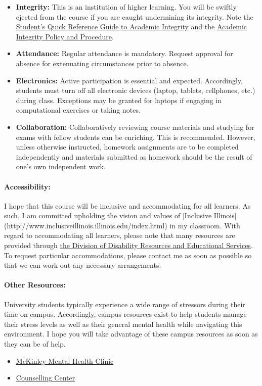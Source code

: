 \documentclass[11pt, a4paper]{article}
\begin{document}
\begin{itemize}
\item[] \textbf{Integrity:} This is an institution of higher
learning. You will be swiftly ejected from the course if you are caught
undermining its integrity. Note the
\href{http://www.provost.illinois.edu/academicintegrity/students.html}{Student's
Quick Reference Guide to Academic Integrity} and the
\href{http://studentcode.illinois.edu/article1_part4_1-401.html}{Academic
Integrity Policy and Procedure}.  
\item[] \textbf{Attendance:} Regular attendance is mandatory. Request approval for absence for extenuating circumstances prior to absence.
\item[] \textbf{Electronics:} Active participation is essential and expected. 
        Accordingly, students must turn off all electronic devices (laptop, 
        tablets, cellphones, etc.) during class. Exceptions may be granted for 
        laptops if engaging in computational exercises or taking notes. 
\item[] \textbf{Collaboration:} Collaboratively reviewing course materials and studying for exams with fellow students can be enriching.  This is recommended.  However, unless otherwise instructed, homework assignments are to be completed independently and materials submitted as homework should be the result of one's own independent work.
\end{itemize}

\paragraph{Accessibility:} I hope that this course will be inclusive and 
accommodating for all learners. As such, I am committed upholding the vision 
and values of [Inclusive 
Illinois](http://www.inclusiveillinois.illinois.edu/index.html) in my 
classroom.  With regard to accommodating all learners, please note that many 
resources are provided through 
\href{http://disability.illinois.edu/academic-support/accommodations}{the 
Division of Disability Resources and Educational Services}.  To request 
particular accommodations, please contact me as soon as possible so that we can 
work out any necessary arrangements.

\paragraph{Other Resources:} 
University students typically experience a wide range of stressors during their 
time on campus. Accordingly, campus resources exist to help students manage their 
stress levels as well as their general mental health while navigating this environment. I 
hope you will take advantage of these campus resources as soon as they can be 
of help.

\begin{itemize}
\item \href{http://www.mckinley.illinois.edu/clinics/mental\_health.htm}{McKinley Mental Health Clinic}
\item \href{http://counselingcenter.illinois.edu/}{Counselling Center}
\end{itemize}
\end{document}
